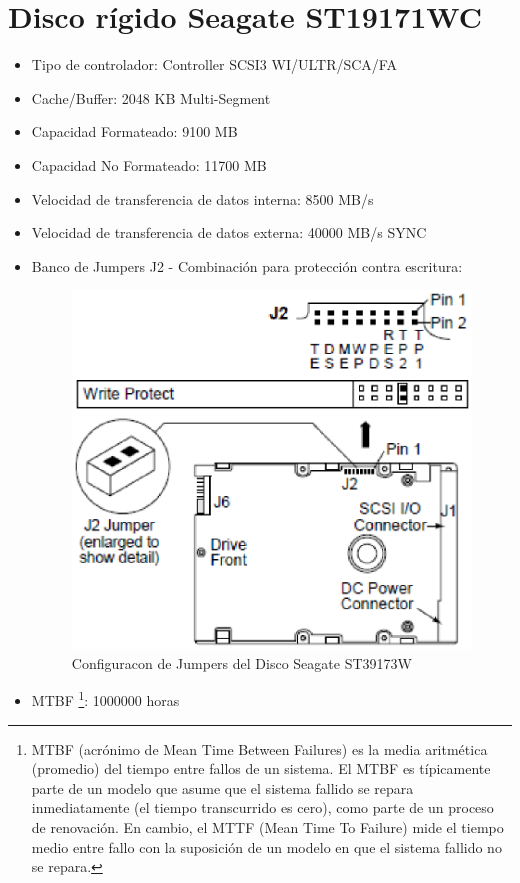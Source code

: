 \documentclass[a4paper]{article}
\begin{document}
\section{Disco rígido Seagate ST19171WC}
\begin{itemize}
\item Tipo de controlador: Controller SCSI3 WI/ULTR/SCA/FA
\item Cache/Buffer: 2048 KB Multi-Segment
\item Capacidad Formateado: 9100 MB
\item Capacidad No Formateado: 11700 MB
\item Velocidad de transferencia de datos interna: 8500 MB/s 
\item Velocidad de transferencia de datos externa: 40000 MB/s SYNC
\item Banco de Jumpers J2 - Combinación para protección contra escritura:
\begin{figure}[H] \begin{center}
\includegraphics[scale=0.75]{imgs/pinesst19171wc.eps} 
\caption{Configuracon de Jumpers del Disco Seagate ST39173W}
\end{center}
\end{figure}
\item MTBF \footnote{MTBF (acrónimo de Mean Time Between Failures) es la media aritmética (promedio) del tiempo entre fallos de un sistema. El MTBF es típicamente parte de un modelo que asume que el sistema fallido se repara inmediatamente (el tiempo transcurrido es cero), como parte de un proceso de renovación. En cambio, el MTTF (Mean Time To Failure) mide el tiempo medio entre fallo con la suposición de un modelo en que el sistema fallido no se repara.}: 1000000 horas
\end{itemize}
\end{document}
